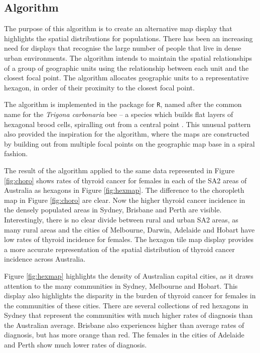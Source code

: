 \hypertarget{algorithm}{%
\subsection{Algorithm}\label{algorithm}}

The purpose of this algorithm is to create an alternative map display
that highlights the spatial distributions for populations. There has
been an increasing need for displays that recognise the large number of
people that live in dense urban environments. The algorithm intends to
maintain the spatial relationships of a group of geographic units using
the relationship between each unit and the closest focal point. The
algorithm allocates geographic units to a representative hexagon, in
order of their proximity to the closest focal point.

The algorithm is implemented in the  package for
\texttt{R}, named after the common name for the \emph{Trigona
carbonaria} bee -- a species which builds flat layers of hexagonal brood
cells, spiralling out from a central point \citep{PH}. This unusual
pattern also provided the inspiration for the algorithm, where the maps
are constructed by building out from multiple focal points on the
geographic map base in a spiral fashion.

The result of the algorithm applied to the same data represented in
Figure \ref{fig:choro} shows rates of thyroid cancer for females in each
of the SA2 areas of Australia as hexagons in Figure \ref{fig:hexmap}.
The difference to the choropleth map in Figure \ref{fig:choro} are
clear. Now the higher thyroid cancer incidence in the densely populated
areas in Sydney, Brisbane and Perth are visible. Interestingly, there is
no clear divide between rural and urban SA2 areas, as many rural areas
and the cities of Melbourne, Darwin, Adelaide and Hobart have low rates
of thyroid incidence for females. The hexagon tile map display provides
a more accurate representation of the spatial distribution of thyroid
cancer incidence across Australia.

Figure \ref{fig:hexmap} highlights the density of Australian capital
cities, as it draws attention to the many communities in Sydney,
Melbourne and Hobart. This display also highlights the disparity in the
burden of thyroid cancer for females in the communities of these cities.
There are several collections of red hexagons in Sydney that represent
the communities with much higher rates of diagnosis than the Australian
average. Brisbane also experiences higher than average rates of
diagnosis, but has more orange than red. The females in the cities of
Adelaide and Perth show much lower rates of diagnosis.

